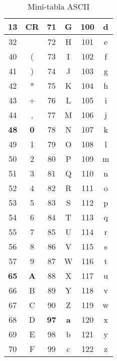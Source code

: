\documentclass[10pt,twocolumn]{article}
\begin{document}
\begin{table}[h!]
  \centering
  \begin{tabular}{|cc|cc|cc|}
  \hline
  13          & CR         & 71         & G            & 100 & d               \\ \hline  
  32          &            & 72         & H            & 101 & e               \\ \hline
  40          & (          & 73         & I            & 102 & f               \\ \hline
  41          & )          & 74         & J            & 103 & g               \\ \hline
  42          & *          & 75         & K            & 104 & h               \\ \hline
  43          & +          & 76         & L            & 105 & i               \\ \hline
  44          & ,          & 77         & M            & 106 & j               \\ \hline
  \textbf{48} & \textbf{0} & 78         & N            & 107 & k               \\ \hline
  49          & 1          & 79         & O            & 108 & l               \\ \hline
  50          & 2          & 80         & P            & 109 & m               \\ \hline
  51          & 3          & 81         & Q            & 110 & n               \\ \hline
  52          & 4          & 82         & R            & 111 & o               \\ \hline
  53          & 5          & 83         & S            & 112 & p               \\ \hline
  54          & 6          & 84         & T            & 113 & q               \\ \hline
  55          & 7          & 85         & U            & 114 & r               \\ \hline
  56          & 8          & 86         & V            & 115 & s               \\ \hline
  57          & 9          & 87         & W            & 116 & t               \\ \hline
  \textbf{65} & \textbf{A} & 88         & X            & 117 & u               \\ \hline
  66          & B          & 89         & Y            & 118 & v               \\ \hline
  67          & C          & 90         & Z            & 119 & w               \\ \hline
  68          & D          & \textbf{97}& \textbf{a}   & 120 & x               \\ \hline
  69          & E          & 98         & b            & 121 & y               \\ \hline
  70          & F          & 99         & c            & 122 & z               \\ \hline
  \end{tabular}
  \caption{Mini-tabla ASCII }
  \label{tab:ascii}
\end{table}
\end{document}
